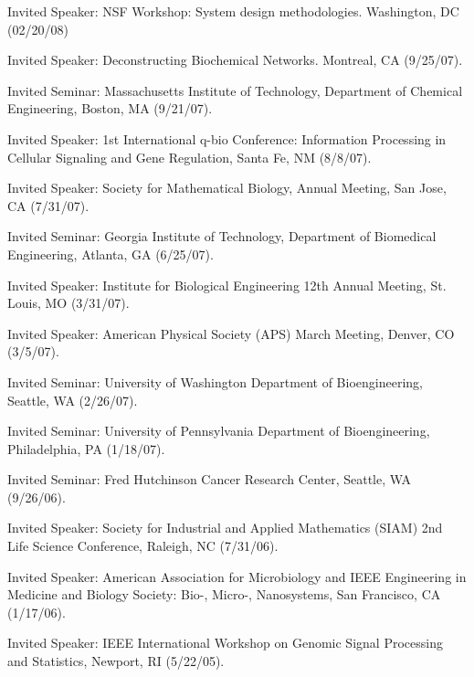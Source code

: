 \item Invited Speaker: NSF Workshop: System design methodologies.  Washington, DC (02/20/08)


\item Invited Speaker: Deconstructing Biochemical Networks. Montreal, CA (9/25/07).

\item Invited Seminar: Massachusetts Institute of Technology, Department of Chemical Engineering, Boston, MA (9/21/07).

\item Invited Speaker: 1st International q-bio Conference: Information Processing in Cellular Signaling and Gene
Regulation, Santa Fe, NM (8/8/07).

\item Invited Speaker: Society for Mathematical Biology, Annual Meeting, San Jose, CA (7/31/07).

\item Invited Seminar: Georgia Institute of Technology, Department of Biomedical Engineering, Atlanta, GA (6/25/07).

\item Invited Speaker: Institute for Biological Engineering 12th Annual Meeting, St. Louis, MO (3/31/07).

\item Invited Speaker: American Physical Society (APS) March Meeting, Denver, CO (3/5/07).

\item Invited Seminar: University of Washington Department of Bioengineering,
Seattle, WA (2/26/07).

\item Invited Seminar: University of Pennsylvania Department of Bioengineering,
Philadelphia, PA (1/18/07).

\item Invited Seminar: Fred Hutchinson Cancer Research Center, Seattle, WA (9/26/06).

\item Invited Speaker: Society for Industrial and Applied Mathematics (SIAM) 2nd Life
Science Conference, Raleigh, NC (7/31/06).


\item Invited Speaker: American Association for Microbiology and IEEE Engineering
in Medicine and Biology Society: Bio-, Micro-, Nanosystems, San
Francisco, CA (1/17/06).


\item Invited Speaker: IEEE International Workshop on Genomic Signal Processing and
Statistics, Newport, RI (5/22/05).


